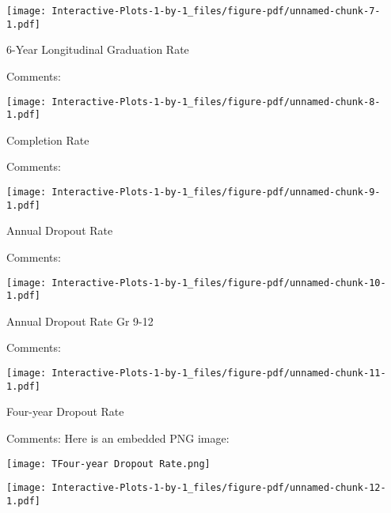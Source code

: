 \documentclass[
  letterpaper,
  DIV=11,
  numbers=noendperiod]{scrartcl}
\begin{document}
\texttt{[image: Interactive-Plots-1-by-1\_files/figure-pdf/unnamed-chunk-7-1.pdf]}

6-Year Longitudinal Graduation Rate

Comments:

\texttt{[image: Interactive-Plots-1-by-1\_files/figure-pdf/unnamed-chunk-8-1.pdf]}

Completion Rate

Comments:

\texttt{[image: Interactive-Plots-1-by-1\_files/figure-pdf/unnamed-chunk-9-1.pdf]}

Annual Dropout Rate

Comments:

\texttt{[image: Interactive-Plots-1-by-1\_files/figure-pdf/unnamed-chunk-10-1.pdf]}

Annual Dropout Rate Gr 9-12

Comments:

\texttt{[image: Interactive-Plots-1-by-1\_files/figure-pdf/unnamed-chunk-11-1.pdf]}

Four-year Dropout Rate

Comments: Here is an embedded PNG image:

\texttt{[image: TFour-year Dropout Rate.png]}

\texttt{[image: Interactive-Plots-1-by-1\_files/figure-pdf/unnamed-chunk-12-1.pdf]}
\end{document}

